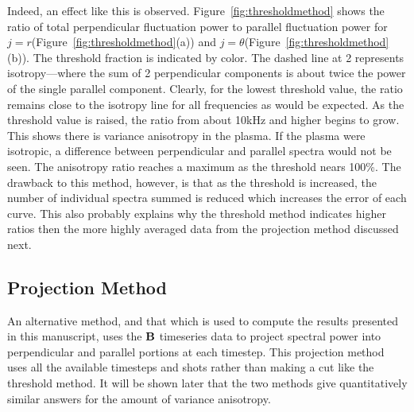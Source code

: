 \documentclass[manuscript]{aastex}
\begin{document}
Indeed, an effect like this is observed. Figure~\ref{fig:thresholdmethod} shows the ratio of total perpendicular fluctuation power to parallel fluctuation power for $j = r$(Figure~\ref{fig:thresholdmethod}(a)) and $j = \theta$(Figure~\ref{fig:thresholdmethod}(b)). The threshold fraction is indicated by color. The dashed line at 2 represents isotropy---where the sum of 2 perpendicular components is about twice the power of the single parallel component. Clearly, for the lowest threshold value, the ratio remains close to the isotropy line for all frequencies as would be expected. As the threshold value is raised, the ratio from about 10kHz and higher begins to grow. This shows there is variance anisotropy in the plasma. If the plasma were isotropic, a difference between perpendicular and parallel spectra would not be seen. The anisotropy ratio reaches a maximum as the threshold nears 100\%. The drawback to this method, however, is that as the threshold is increased, the number of individual spectra summed is reduced which increases the error of each curve. This also probably explains why the threshold method indicates higher ratios then the more highly averaged data from the projection method discussed next.

\subsection{Projection Method}\label{sec:projection2}

An alternative method, and that which is used to compute the results presented in this manuscript, uses the ${\bf B}$ timeseries data to project spectral power into perpendicular and parallel portions at each timestep. This projection method uses all the available timesteps and shots rather than making a cut like the threshold method. It will be shown later that the two methods give quantitatively similar answers for the amount of variance anisotropy.
\end{document}
